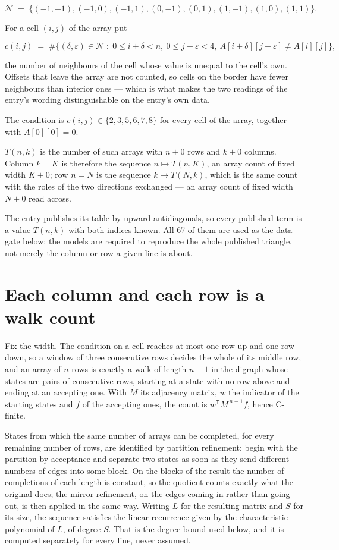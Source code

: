 \documentclass[11pt]{article}
\theoremstyle{definition}
\begin{document}
\[\mathcal{N} \;=\; \{(-1,-1), (-1,0), (-1,1), (0,-1), (0,1), (1,-1), (1,0), (1,1)\}.\]

For a cell $(i,j)$ of the array put

\[c(i,j) \;=\; \#\bigl\{(\delta,\varepsilon)\in\mathcal{N} \;:\; 0\le i+\delta<n,\ 0\le j+\varepsilon<4,\ A[i+\delta][j+\varepsilon] \neq A[i][j]\bigr\},\]

the number of neighbours of the cell whose value is unequal to the cell's own. Offsets that leave the array are not counted, so cells on the border have fewer neighbours than interior ones --- which is what makes the two readings of the entry's wording distinguishable on the entry's own data.

The condition is $c(i,j) \in \{2, 3, 5, 6, 7, 8\}$ for every cell of the array, together with $A[0][0]=0$.

$T(n,k)$ is the number of such arrays with $n + 0$ rows and $k + 0$ columns. Column $k = K$ is therefore the sequence $n \mapsto T(n,K)$, an array count of fixed width $K + 0$; row $n = N$ is the sequence $k \mapsto T(N,k)$, which is the same count with the roles of the two directions exchanged --- an array count of fixed width $N + 0$ read across.

The entry publishes its table by upward antidiagonals, so every published term is a value $T(n,k)$ with both indices known. All 67 of them are used as the data gate below: the models are required to reproduce the whole published triangle, not merely the column or row a given line is about.

\section{Each column and each row is a walk count}

Fix the width. The condition on a cell reaches at most one row up and one row down, so a window of three consecutive rows decides the whole of its middle row, and an array of $n$ rows is exactly a walk of length $n-1$ in the digraph whose states are pairs of consecutive rows, starting at a state with no row above and ending at an accepting one. With $M$ its adjacency matrix, $w$ the indicator of the starting states and $f$ of the accepting ones, the count is $w^{\mathsf T}M^{\,n-1}f$, hence C-finite.

States from which the same number of arrays can be completed, for every remaining number of rows, are identified by partition refinement: begin with the partition by acceptance and separate two states as soon as they send different numbers of edges into some block. On the blocks of the result the number of completions of each length is constant, so the quotient counts exactly what the original does; the mirror refinement, on the edges coming in rather than going out, is then applied in the same way. Writing $L$ for the resulting matrix and $S$ for its size, the sequence satisfies the linear recurrence given by the characteristic polynomial of $L$, of degree $S$. That is the degree bound used below, and it is computed separately for every line, never assumed.
\end{document}
